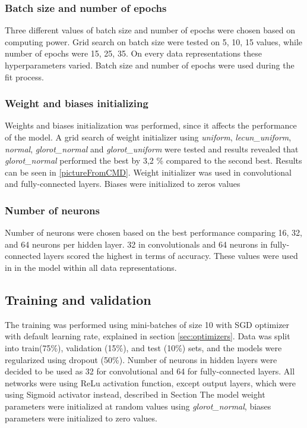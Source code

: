 \subsubsection{Batch size and number of epochs}
Three different values of batch size and number of epochs were chosen based on computing power. Grid search on batch size were tested on 5, 10, 15 values, while number of epochs were 15, 25, 35. On every data representations these hyperparameters varied. Batch size and number of epochs were used during the fit process.

\subsubsection{Weight and biases initializing}
Weights and biases initialization was performed, since it affects the performance of the model.
A grid search of weight initializer using \textit{uniform}, \textit{lecun\_uniform}, \textit{normal}, \textit{glorot\_normal} and \textit{glorot\_uniform} were tested and results revealed that \textit{glorot\_normal} performed the best by 3,2 \% compared to the second best. Results can be seen in \ref{pictureFromCMD}. Weight initializer was used in convolutional and fully-connected layers.
Biases were initialized to zeros values

\subsubsection{Number of neurons}
Number of neurons were chosen based on the best performance comparing 16, 32, and 64 neurons per hidden layer. 32 in convolutionals and 64 neurons in fully-connected layers scored the highest in terms of accuracy. These values were used in in the model within all data representations.

\subsection{Training and validation}
The training was performed using mini-batches of size 10 with SGD optimizer with default learning rate, explained in section \ref{sec:optimizers}. Data was split into train(75\%), validation (15\%), and test (10\%) sets, and the models were regularized using dropout (50\%). Number of neurons in hidden layers were decided to be used as 32 for convolutional and 64 for fully-connected layers. All networks were using ReLu activation function, except output layers, which were using Sigmoid activator instead, described in Section %
The model weight parameters were initialized at random values using \textit{glorot\_normal}, biases parameters were initialized to zero values.

